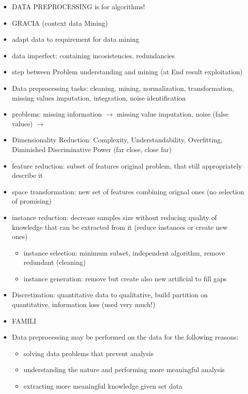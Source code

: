 \documentclass[preview]{standalone}
\begin{document}
		\begin{itemize}
			\item DATA PREPROCESSING is for algorithms!
			\item GRACIA (context data Mining)
			\item adapt data to requirement for data mining
			\item data imperfect: containing incosistencies, redundancies
			\item step between Problem understanding and mining (at End result exploitation)
			\item Data preprocessing tasks: cleaning, mining, normalization, transformation, missing values imputation, integration, noise identification
			\item problems: missing information $\to$ missing value imputation, noise (false values) $\to$
			\item Dimensionality Reduction: Complexity, Understandability, Overfitting, Diminished Discriminative Power (far close, close far)
			\item feature reduction: subset of features original problem, that still appropriately describe it
			\item space transformation: new set of features combining orignal ones (no selection of promising)
			\item instance reduction: decrease samples size without reducing quality of knowledge that can be extracted from it (reduce instances or create new ones)
			\begin{itemize}
				\item instance selection: minimum subset, independent algorithm, remove redundant (cleaning)
				\item instance generation: remove but create also new artificial to fill gaps
			\end{itemize}
			\item Discretization: quantitative data to qualitative, build partition on quantitative, information loss (used very much!)
			\item FAMILI
			\item Data preprocessing may be performed on the data for the following reasons:
			\begin{itemize}
				\item solving data problems that prevent analysis
				\item understanding the nature and performing more meaningful analysis
				\item extracting more meaningful knowledge given set data

\end{itemize}
\end{itemize}
\end{document}
